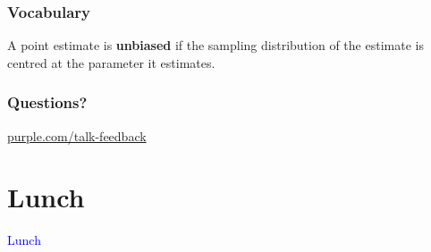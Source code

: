 \documentclass[t]{beamer}
\newcommand\blue[1]{\textcolor{blue}{#1}}
\newcommand\talksection[1]{\section{#1}
\begin{frame}
  \vfill\Huge\bf\blue{\centerline{#1}}
\end{frame}
}
\begin{document}
\begin{frame}
  \frametitle{Vocabulary}

  A point estimate is \textbf{unbiased} if the sampling distribution
  of the estimate is centred at the parameter it estimates.


\end{frame}

\begin{frame}
  \frametitle{Questions?}
  \vspace{3cm}
  \centerline{\large\url{purple.com/talk-feedback}}
\end{frame}

\talksection{Lunch}
\end{document}
